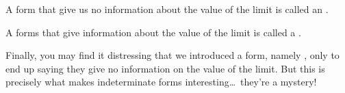 \documentclass{ximera}
\begin{document}
\begin{definition}
A form that give us no information about the value of the limit is
called an .

A forms that give information about the value of the limit is called a
.
\end{definition}  

Finally, you may find it distressing that we introduced a form, namely
\zeroOverZero, only to end up saying they give no information on the
value of the limit. But this is precisely what makes
indeterminate forms interesting\dots~they're a mystery!
\end{document}
